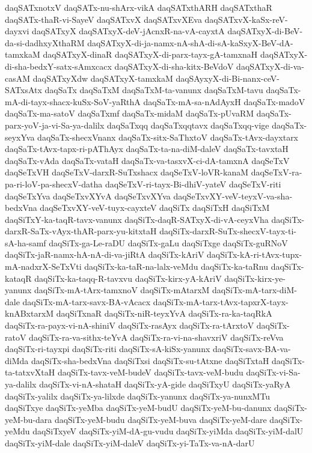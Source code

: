 {daqSATxnotxV
daqSATx-nu-shArx-vikA
daqSATxthARH
daqSATxthaR
daqSATx-thaR-vi-SayeV
daqSATxvX
daqSATxvXEva
daqSATxvX-kaSx-reV-dayxvi
daqSATxyX
daqSATxyX-deV-jAcnxR-na-vA-cayxtA
daqSATxyX-di-BeV-da-si-dadhxyXthaRM
daqSATxyX-di-ja-namx-nA-shA-di-sA-kaSxyX-BeV-dA-tamxkaM
daqSATxyX-dinaR
daqSATxyX-di-parx-tayx-gA-tamxnaH
daqSATxyX-di-sha-bedxY-satx-sAmxcacx
daqSATxyX-di-sha-kitx-BeVdoV
daqSATxyX-di-va-casAM
daqSATxyXdw
daqSATxyX-tamxkaM
daqSAyxyX-di-Bi-nanx-ceV-SATxsAtx
daqSaTx
daqSaTxM
daqSaTxM-ta-vanunx
daqSaTxM-tavu
daqSaTx-mA-di-tayx-shacx-kuSx-SoV-yaRthA
daqSaTx-mA-sa-nAdAyxH
daqSaTx-madoV
daqSaTx-ma-satoV
daqSaTxmf
daqSaTx-midaM
daqSaTx-pUvaRM
daqSaTx-parx-yoV-ja-vi-Sa-ya-dalilx
daqSaTxqq
daqSaTxqqtavx
daqSaTxqq-vige
daqSaTx-seyxYva
daqSaTx-shecxVnanx
daqSaTx-sitx-SaThxtoV
daqSaTx-tAvx-dayxtarx
daqSaTx-tAvx-tapx-ri-pAThAyx
daqSaTx-ta-na-diM-daleV
daqSaTx-tavxtaH
daqSaTx-vAda
daqSaTx-vataH
daqSaTx-va-tasxvX-ci-dA-tamxnA
daqSeTxV
daqSeTxVH
daqSeTxV-darxR-SuTxshacx
daqSeTxV-loVR-kanaM
daqSeTxV-ra-pa-ri-loV-pa-shecxV-datha
daqSeTxV-ri-tayx-Bi-dhiV-yateV
daqSeTxV-riti
daqSeTxYva
daqSeTxvXYvA
daqSeTxvXYva
daqSeTxvXY-veV-teyxV-va-sha-bedxVna
daqSeTxvXY-veV-tuyx-cayxteV
daqSiTx
daqSiTxH
daqSiTxM
daqSiTxY-ka-taqR-tavx-vanunx
daqSiTx-daqR-SATxyX-di-vA-ceyxVha
daqSiTx-darxR-SaTx-vAyx-thAR-parx-yu-kitxtaH
daqSiTx-darxR-SuTx-shecxV-tayx-ti-sA-ha-samf
daqSiTx-ga-Le-raDU
daqSiTx-gaLu
daqSiTxge
daqSiTx-guRNoV
daqSiTx-jaR-namx-hA-nA-di-va-jiRtA
daqSiTx-kAriV
daqSiTx-kA-ri-tAvx-tupx-mA-nadxrX-SeTxVti
daqSiTx-ka-taR-na-lalx-veMdu
daqSiTx-ka-taRnu
daqSiTx-kataqR
daqSiTx-ka-taqq-R-tavxvu
daqSiTx-kirx-yA-kAriV
daqSiTx-kirx-ye-yanunx
daqSiTx-mA-tArx-tamxnoV
daqSiTx-mAtarxM
daqSiTx-mA-tarx-diM-dale
daqSiTx-mA-tarx-savx-BA-vAcacx
daqSiTx-mA-tarx-tAvx-tapxrX-tayx-knABxtarxM
daqSiTxnaR
daqSiTx-niR-teyxYvA
daqSiTx-ra-ka-taqRkA
daqSiTx-ra-payx-vi-nA-shiniV
daqSiTx-rasAyx
daqSiTx-ra-tArxtoV
daqSiTx-ratoV
daqSiTx-ra-va-sithx-teYvA
daqSiTx-ra-vi-na-shavxriV
daqSiTx-reVva
daqSiTx-ri-tayxpi
daqSiTx-riti
daqSiTx-sA-kiSx-yanunx
daqSiTx-savx-BA-va-diMda
daqSiTx-sha-bedxVna
daqSiTxsi
daqSiTx-su-tAtxne
daqSiTxtaH
daqSiTx-ta-tatxvXtaH
daqSiTx-tavx-veM-budeV
daqSiTx-tavx-veM-budu
daqSiTx-vi-Sa-ya-dalilx
daqSiTx-vi-nA-shataH
daqSiTx-yA-gide
daqSiTxyU
daqSiTx-yaRyA
daqSiTx-yalilx
daqSiTx-ya-lilxde
daqSiTx-yanunx
daqSiTx-ya-nunxMTu
daqSiTxye
daqSiTx-yeMba
daqSiTx-yeM-budU
daqSiTx-yeM-bu-danunx
daqSiTx-yeM-bu-dara
daqSiTx-yeM-budu
daqSiTx-yeM-buva
daqSiTx-yeM-dare
daqSiTx-yeMdu
daqSiTxyeV
daqSiTx-yiM-dA-gu-vudu
daqSiTx-yiMda
daqSiTx-yiM-dalU
daqSiTx-yiM-dale
daqSiTx-yiM-daleV
daqSiTx-yi-TaTx-va-nA-darU
}
